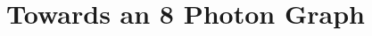 \documentclass[aps,floatfix,superscriptaddress,onecolumn,tightenlines,amsmath,amssymb,nofootinbib,raggedbottom,nobalancelastpage,10pt]{revtex4-2}
\begin{document}
\title{\normalfont\Large{Towards an 8 Photon Graph}}
\maketitle

%
%
%
%
%
%
%
\end{document}
